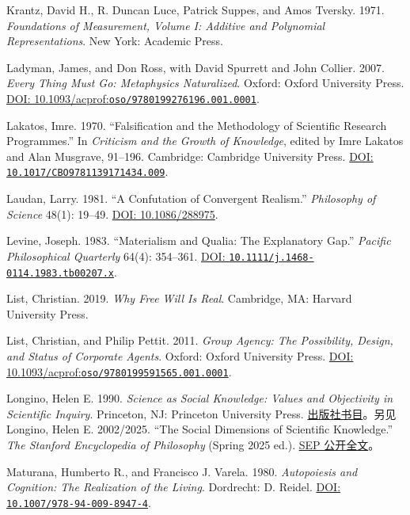 \documentclass[
  11pt,
  oneside]{book}
\begin{document}
Krantz, David H., R. Duncan Luce, Patrick Suppes, and Amos Tversky. 1971. \emph{Foundations of Measurement, Volume I: Additive and Polynomial Representations}. New York: Academic Press.

Ladyman, James, and Don Ross, with David Spurrett and John Collier. 2007. \emph{Every Thing Must Go: Metaphysics Naturalized}. Oxford: Oxford University Press. \href{https://doi.org/10.1093/acprof:oso/9780199276196.001.0001}{DOI: 10.1093/acprof:\nolinkurl{oso/9780199276196.001.0001}}.

Lakatos, Imre. 1970. ``Falsification and the Methodology of Scientific Research Programmes.'' In \emph{Criticism and the Growth of Knowledge}, edited by Imre Lakatos and Alan Musgrave, 91--196. Cambridge: Cambridge University Press. \href{https://doi.org/10.1017/CBO9781139171434.009}{DOI: \nolinkurl{10.1017/CBO9781139171434.009}}.

Laudan, Larry. 1981. ``A Confutation of Convergent Realism.'' \emph{Philosophy of Science} 48(1): 19--49. \href{https://doi.org/10.1086/288975}{DOI: 10.1086/288975}.

Levine, Joseph. 1983. ``Materialism and Qualia: The Explanatory Gap.'' \emph{Pacific Philosophical Quarterly} 64(4): 354--361. \href{https://doi.org/10.1111/j.1468-0114.1983.tb00207.x}{DOI: \nolinkurl{10.1111/j.1468-0114.1983.tb00207.x}}.

List, Christian. 2019. \emph{Why Free Will Is Real}. Cambridge, MA: Harvard University Press.

List, Christian, and Philip Pettit. 2011. \emph{Group Agency: The Possibility, Design, and Status of Corporate Agents}. Oxford: Oxford University Press. \href{https://doi.org/10.1093/acprof:oso/9780199591565.001.0001}{DOI: 10.1093/acprof:\nolinkurl{oso/9780199591565.001.0001}}.

Longino, Helen E. 1990. \emph{Science as Social Knowledge: Values and Objectivity in Scientific Inquiry}. Princeton, NJ: Princeton University Press. \href{https://press.princeton.edu/books/paperback/9780691020518/science-as-social-knowledge}{出版社书目}。另见 Longino, Helen E. 2002/2025. ``The Social Dimensions of Scientific Knowledge.'' \emph{The Stanford Encyclopedia of Philosophy} (Spring 2025 ed.). \href{https://plato.stanford.edu/entries/scientific-knowledge-social/}{SEP 公开全文}。

Maturana, Humberto R., and Francisco J. Varela. 1980. \emph{Autopoiesis and Cognition: The Realization of the Living}. Dordrecht: D. Reidel. \href{https://doi.org/10.1007/978-94-009-8947-4}{DOI: \nolinkurl{10.1007/978-94-009-8947-4}}.
\end{document}
